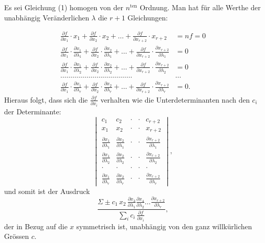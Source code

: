 \documentclass{article}
\begin{document}
Es sei Gleichung (1) homogen von der $n^{\text{ten}}$ Ordnung. Man hat für alle Werthe der unabhängig Veränderlichen $\lambda$ die $r+1$ Gleichungen:

\[
\begin{aligned}
\frac{\partial f}{\partial x_1} \cdot x_1 + \frac{\partial f}{\partial x_2} \cdot x_2 + \dots + \frac{\partial f}{\partial x_{r+2}} \cdot x_{r+2} &= nf = 0 \\
\frac{\partial f}{\partial x_1} \cdot \frac{\partial x_1}{\partial \lambda_1} + \frac{\partial f}{\partial x_2} \cdot \frac{\partial x_2}{\partial \lambda_1} + \dots + \frac{\partial f}{\partial x_{r+2}} \cdot \frac{\partial x_{r+2}}{\partial \lambda_1} &= 0 \\
\frac{\partial f}{\partial x_1} \cdot \frac{\partial x_1}{\partial \lambda_2} + \frac{\partial f}{\partial x_2} \cdot \frac{\partial x_2}{\partial \lambda_2} + \dots + \frac{\partial f}{\partial x_{r+2}} \cdot \frac{\partial x_{r+2}}{\partial \lambda_2} &= 0 \\
\dots\dots\dots\dots\dots\dots\dots\dots\dots\dots\dots\dots & \dots \\
\frac{\partial f}{\partial x_1} \cdot \frac{\partial x_1}{\partial \lambda_r} + \frac{\partial f}{\partial x_2} \cdot \frac{\partial x_2}{\partial \lambda_r} + \dots + \frac{\partial f}{\partial x_{r+2}} \cdot \frac{\partial x_{r+2}}{\partial \lambda_r} &= 0.
\end{aligned}
\]
Hieraus folgt, dass sich die $\frac{\partial f}{\partial x_i}$ verhalten wie die Unterdeterminanten nach den $c_i$ der Determinante:
\[
\begin{vmatrix}
c_1 & c_2 & \cdot & \cdot & c_{r+2} \\
x_1 & x_2 & \cdot & \cdot & x_{r+2} \\
\frac{\partial x_1}{\partial \lambda_1} & \frac{\partial x_2}{\partial \lambda_1} & \cdot & \cdot & \frac{\partial x_{r+2}}{\partial \lambda_1} \\
\frac{\partial x_1}{\partial \lambda_2} & \frac{\partial x_2}{\partial \lambda_2} & \cdot & \cdot & \frac{\partial x_{r+2}}{\partial \lambda_2} \\
\cdot & \cdot & \cdot & \cdot & \cdot \\
\frac{\partial x_1}{\partial \lambda_r} & \frac{\partial x_2}{\partial \lambda_r} & \cdot & \cdot & \frac{\partial x_{r+2}}{\partial \lambda_r}
\end{vmatrix},
\]
und somit ist der Ausdruck
\[
\frac{\Sigma \pm c_1\, x_2\, \frac{\partial x_3}{\partial \lambda_1} \frac{\partial x_4}{\partial \lambda_2} \dots \frac{\partial x_{r+2}}{\partial \lambda_r}}{\displaystyle\sum_i c_i\, \frac{\partial f}{\partial x_i}},
\]
der in Bezug auf die $x$ symmetrisch ist, unabhängig von den ganz willkürlichen Grössen $c$.
\end{document}
